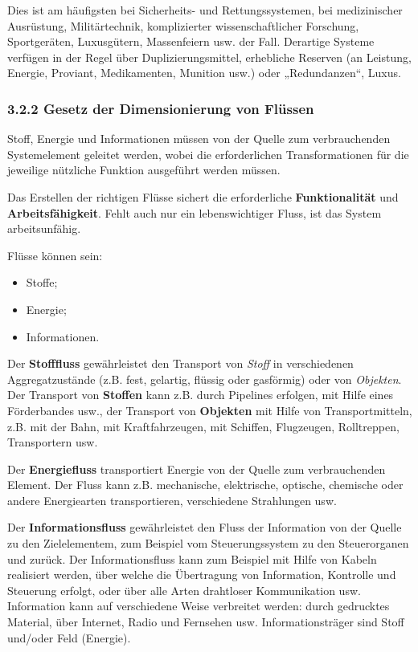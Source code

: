 \documentclass[11pt,a4paper]{article}
\begin{document}
Dies ist am häufigsten bei Sicherheits- und Rettungssystemen, bei
medizinischer Ausrüstung, Militärtechnik, komplizierter wissenschaftlicher
Forschung, Sportgeräten, Luxusgütern, Massenfeiern usw. der Fall.  Derartige
Systeme verfügen in der Regel über Duplizierungsmittel, erhebliche Reserven
(an Leistung, Energie, Proviant, Medikamenten, Munition usw.)  oder
„Redundanzen“, Luxus.

\subsubsection{3.2.2 Gesetz der Dimensionierung von Flüssen}

Stoff, Energie und Informationen müssen von der Quelle zum verbrauchenden
Systemelement geleitet werden, wobei die erforderlichen Transformationen für
die jeweilige nützliche Funktion ausgeführt werden müssen.

Das Erstellen der richtigen Flüsse sichert die erforderliche
\textbf{Funktionalität} und \textbf{Arbeits\-fähigkeit}. Fehlt auch nur ein
lebenswichtiger Fluss, ist das System arbeitsunfähig.

Flüsse können sein:
\begin{itemize}[noitemsep] 
\item Stoffe;
\item Energie;
\item Informationen.
\end{itemize}
Der \textbf{Stofffluss} gewährleistet den Transport von \emph{Stoff} in
verschiedenen Aggregatzustände (z.B. fest, gelartig, flüssig oder gasförmig)
oder von \emph{Objekten}.  Der Transport von \textbf{Stoffen} kann z.B. durch
Pipelines erfolgen, mit Hilfe eines Förderbandes usw., der Transport von
\textbf{Objekten} mit Hilfe von Transportmitteln, z.B. mit der Bahn, mit
Kraftfahrzeugen, mit Schiffen, Flugzeugen, Rolltreppen, Transportern usw.

Der \textbf{Energiefluss} transportiert Energie von der Quelle zum
verbrauchenden Element.  Der Fluss kann z.B. mechanische, elektrische,
optische, chemische oder andere Energiearten transportieren, verschiedene
Strahlungen usw.

Der \textbf{Informationsfluss} gewährleistet den Fluss der Information von der
Quelle zu den Zielelementem, zum Beispiel vom Steuerungssystem zu den
Steuerorganen und zurück. Der Informationsfluss kann zum Beispiel mit Hilfe
von Kabeln realisiert werden, über welche die Übertragung von Information,
Kontrolle und Steuerung erfolgt, oder über alle Arten drahtloser Kommunikation
usw. Information kann auf verschiedene Weise verbreitet werden: durch
gedrucktes Material, über Internet, Radio und Fernsehen usw.
Informationsträger sind Stoff und/oder Feld (Energie).
\end{document}
